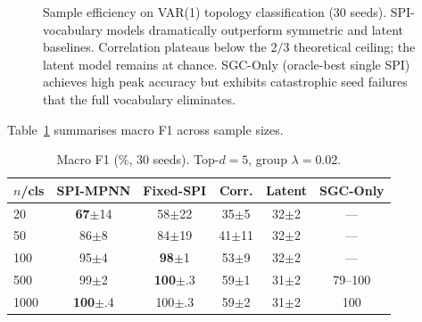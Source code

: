 \documentclass{article}
\theoremstyle{plain}
\begin{document}
\begin{figure}[t]
\vskip 0.2in
\begin{center}
\caption{Sample efficiency on VAR(1) topology classification (30 seeds). SPI-vocabulary models dramatically outperform symmetric and latent baselines. Correlation plateaus below the $2/3$ theoretical ceiling; the latent model remains at chance. SGC-Only (oracle-best single SPI) achieves high peak accuracy but exhibits catastrophic seed failures that the full vocabulary eliminates.}
\label{fig:sample_efficiency}
\end{center}
\vskip -0.2in
\end{figure}

Table~\ref{tab:main} summarises macro F1 across sample sizes.

\begin{table}[t]
\caption{Macro F1 (\%, 30 seeds). Top-$d{=}5$, group $\lambda{=}0.02$.}
\label{tab:main}
\vskip 0.1in
\begin{center}
\begin{small}
\begin{tabular}{lccccc}
\toprule
$n$/cls & SPI-MPNN & Fixed-SPI & Corr. & Latent & SGC-Only \\
\midrule
20   & \textbf{67}{\scriptsize$\pm$14} & 58{\scriptsize$\pm$22} & 35{\scriptsize$\pm$5}  & 32{\scriptsize$\pm$2} & --- \\
50   & 86{\scriptsize$\pm$8}  & 84{\scriptsize$\pm$19} & 41{\scriptsize$\pm$11} & 32{\scriptsize$\pm$2} & --- \\
100  & 95{\scriptsize$\pm$4}  & \textbf{98}{\scriptsize$\pm$1}  & 53{\scriptsize$\pm$9}  & 32{\scriptsize$\pm$2} & --- \\
500  & 99{\scriptsize$\pm$2}  & \textbf{100}{\scriptsize$\pm$.3} & 59{\scriptsize$\pm$1}  & 31{\scriptsize$\pm$2} & 79--100 \\
1000 & \textbf{100}{\scriptsize$\pm$.4} & 100{\scriptsize$\pm$.3} & 59{\scriptsize$\pm$2}  & 31{\scriptsize$\pm$2} & 100 \\
\bottomrule
\end{tabular}
\end{small}
\end{center}
\vskip -0.15in
\end{table}
\end{document}
